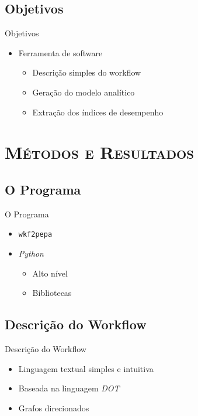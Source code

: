 \documentclass[xcolor=x11names,compress]{beamer}
\renewcommand{\(}{\begin{columns}}
\renewcommand{\)}{\end{columns}}
\newcommand{\<}[1]{\begin{column}{#1}}
\renewcommand{\>}{\end{column}}
\begin{document}
    \subsection{Objetivos}
        \begin{frame}{Objetivos}
            \begin{itemize}[<+->]
                \item Ferramenta de software
                    \begin{itemize}
                        \item Descrição simples do workflow
                        \item Geração do modelo analítico
                        \item Extração dos índices de desempenho
                    \end{itemize}
            \end{itemize}
        \end{frame}

\section{\scshape Métodos e Resultados}

    \subsection{O Programa}
        \begin{frame}{O Programa}
            \begin{itemize}
                \item<1-> \texttt{wkf2pepa}
                \item<2-> \emph{Python}
                    \begin{itemize}
                        \item<3-> Alto nível
                        \item<3-> Bibliotecas
                    \end{itemize}
            \end{itemize}
        \end{frame}

    \subsection{Descrição do Workflow}
        \begin{frame}{Descrição do Workflow}
            \begin{itemize}[<+->]
                \item Linguagem textual simples e intuitiva
                \item Baseada na linguagem \emph{DOT}
                \item Grafos direcionados
            \end{itemize}
        \end{frame}
\end{document}
